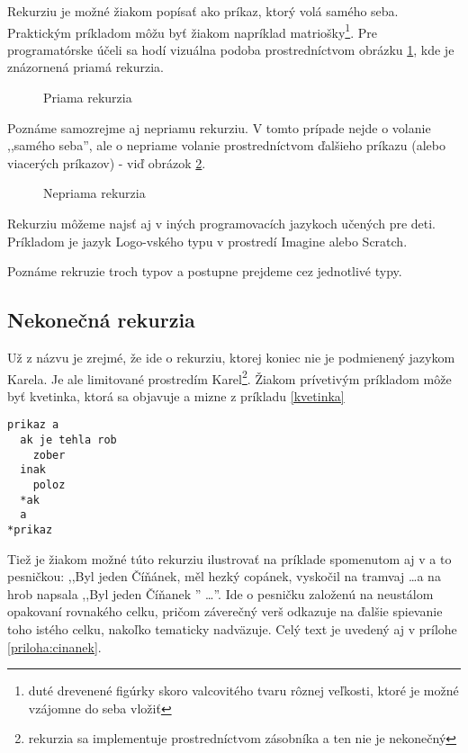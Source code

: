Rekurziu je možné žiakom popísať ako príkaz, ktorý volá samého seba. Praktickým príkladom môžu byť žiakom napríklad matriošky\footnote{duté drevenené figúrky skoro valcovitého tvaru rôznej veľkosti, ktoré je možné vzájomne do seba vložiť}.
Pre programatórske účeli sa hodí vizuálna podoba prostredníctvom obrázku \ref{priamarekurzia}, kde je znázornená priamá rekurzia.

\begin{figure}[ht]
\centering
{}
\caption{Priama rekurzia}
\label{priamarekurzia}
\end{figure}

Poznáme samozrejme aj nepriamu rekurziu.
V tomto prípade nejde o volanie ,,samého seba'', ale o nepriame volanie prostredníctvom ďalšieho príkazu (alebo viacerých príkazov) - viď obrázok \ref{nepriamarekurzia}.

\begin{figure}[ht]
\centering
{}
\caption{Nepriama rekurzia}
\label{nepriamarekurzia}
\end{figure}

Rekurziu môžeme najsť aj v iných programovacích jazykoch učených pre deti.
Príkladom je jazyk Logo-vského typu v prostredí Imagine alebo Scratch.

Poznáme rekruzie troch typov a postupne prejdeme cez jednotlivé typy.

\subsection{Nekone\texorpdfstring{č}{c}ná rekurzia}

Už z názvu je zrejmé, že ide o rekurziu, ktorej koniec nie je podmienený jazykom Karela. Je ale limitované prostredím Karel\footnote{rekurzia sa implementuje prostredníctvom zásobníka a ten nie je nekonečný}. Žiakom prívetivým príkladom môže byť kvetinka, ktorá sa objavuje a mizne z príkladu \ref{kvetinka}

\begin{lstlisting}[label=kvetinka,caption=Kvetinka,captionpos=b]
prikaz a
  ak je tehla rob
    zober
  inak
    poloz
  *ak
  a
*prikaz
\end{lstlisting}

Tiež je žiakom možné túto rekurziu ilustrovať na príklade spomenutom aj v \cite{Snajder03} a to pesničkou: ,,Byl jeden Číňánek, měl hezký copánek, vyskočil na tramvaj \ldots a na hrob napsala ,,Byl jeden Číňanek '' \ldots ''.
Ide o pesničku založenú na neustálom opakovaní rovnakého celku, pričom záverečný verš odkazuje na ďalšie spievanie toho istého celku, nakoľko tematicky nadväzuje.
Celý text je uvedený aj v prílohe \ref{priloha:cinanek}.

